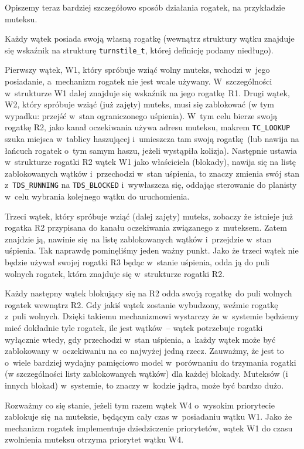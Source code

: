 \documentclass[shortabstract]{iithesis}
\theoremstyle{definition} \newtheorem*{definition}{Definicja}
\theoremstyle{definition} \newtheorem*{example}{Przykład}
\theoremstyle{definition} \newtheorem*{remark}{Uwaga}
\begin{document}
Opiszemy teraz bardziej szczegółowo sposób działania rogatek,
na przykładzie muteksu.

Każdy wątek posiada swoją własną rogatkę (wewnątrz struktury wątku znajduje się wskaźnik na
strukturę \texttt{turnstile\_t}, której definicję podamy niedługo).

Pierwszy wątek, W1, który spróbuje wziąć wolny muteks, wchodzi w~jego posiadanie, a~mechanizm rogatek nie jest
wcale używany. W~szczególności w~strukturze W1 dalej znajduje się wskaźnik na jego rogatkę R1.
Drugi wątek, W2, który spróbuje wziąć (już zajęty) muteks, musi się zablokować (w tym wypadku:
przejść w~stan ograniczonego uśpienia). W~tym celu bierze swoją rogatkę R2, jako kanał oczekiwania używa adresu muteksu,
makrem \texttt{TC\_LOOKUP} szuka miejsca w~tablicy haszującej i~umieszcza tam swoją rogatkę (lub nawija na
łańcuch rogatek o~tym samym haszu, jeżeli wystąpiła kolizja). Następnie ustawia w~strukturze rogatki R2
wątek W1 jako właściciela (blokady), nawija się na listę zablokowanych wątków i~przechodzi w~stan uśpienia,
to znaczy zmienia swój stan z~\texttt{TDS\_RUNNING} na \texttt{TDS\_BLOCKED} i~wywłaszcza się,
oddając sterowanie do planisty w~celu wybrania kolejnego wątku do uruchomienia.

Trzeci wątek, który spróbuje wziąć (dalej zajęty) muteks, zobaczy że istnieje już rogatka R2 przypisana
do kanału oczekiwania związanego z~muteksem. Zatem znajdzie ją, nawinie się na listę zablokowanych wątków
i~przejdzie w~stan uśpienia. Tak naprawdę pominęliśmy jeden ważny punkt. Jako że trzeci wątek nie będzie używał
swojej rogatki R3 będąc w~stanie uśpienia, odda ją do puli wolnych rogatek, która znajduje się w~strukturze
rogatki R2.

Każdy następny wątek blokujący się na R2 odda swoją rogatkę do puli wolnych rogatek wewnątrz R2. Gdy jakiś wątek
zostanie wybudzony, weźmie rogatkę z~puli wolnych. Dzięki takiemu mechanizmowi wystarczy że w~systemie będziemy
mieć dokładnie tyle rogatek, ile jest wątków~-- wątek potrzebuje rogatki wyłącznie wtedy, gdy
przechodzi w~stan uśpienia, a~każdy wątek może być zablokowany w~oczekiwaniu na co najwyżej jedną rzecz. Zauważmy,
że jest to o~wiele bardziej wydajny pamięciowo model w~porównaniu do trzymania rogatki (w szczególności
listy zablokowanych wątków) dla każdej blokady. Muteksów (i innych blokad) w~systemie, to znaczy w~kodzie jądra,
może być bardzo dużo.

Rozważmy co się stanie, jeżeli tym razem wątek W4 o~wysokim priorytecie zablokuje się na muteksie,
będącym cały czas w~posiadaniu wątku W1. Jako że mechanizm rogatek implementuje dziedziczenie priorytetów,
wątek W1 do czasu zwolnienia muteksu otrzyma priorytet wątku W4.
\end{document}
